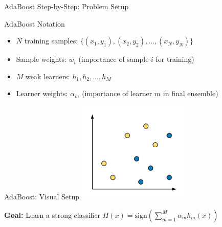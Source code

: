 \documentclass[10pt]{beamer}
\newcommand{\fitpic}[1]{\begin{adjustbox}{max width=\linewidth, max totalheight=0.78\textheight}#1\end{adjustbox}}
\begin{document}
\begin{frame}{AdaBoost Step-by-Step: Problem Setup}
\begin{definitionbox}{AdaBoost Notation}
\begin{itemize}
\item $N$ training samples: $\{(x_1, y_1), (x_2, y_2), \ldots, (x_N, y_N)\}$
\item Sample weights: $w_i$ (importance of sample $i$ for training)
\item $M$ weak learners: $h_1, h_2, \ldots, h_M$
\item Learner weights: $\alpha_m$ (importance of learner $m$ in final ensemble)
\end{itemize}
\end{definitionbox}
\end{frame}

\begin{frame}{AdaBoost: Visual Setup}
  \vspace{0.3cm}
  \centering
  \fitpic{\includegraphics[width = 0.4\textwidth]{../assets/ensemble/diagrams/ada_data}}

\begin{keypointsbox}
\textbf{Goal:} Learn a strong classifier $H(x) = \text{sign}\left(\sum_{m=1}^M \alpha_m h_m(x)\right)$
\end{keypointsbox}
\end{frame}
\end{document}
